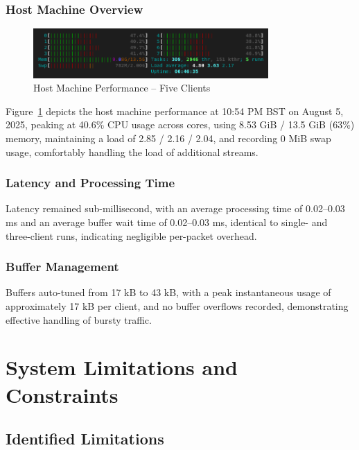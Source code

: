 \subsubsection{Host Machine Overview}

\begin{figure}[H]
\centering
\includegraphics[width=0.8\textwidth]{Evaluation/five-clients-machine-stats.png}
\caption{Host Machine Performance – Five Clients}
\label{fig:host-machine-five-clients}
\end{figure}

Figure~\ref{fig:host-machine-five-clients} depicts the host machine performance at 10:54 PM BST on August 5, 2025, peaking at 40.6\% CPU usage across cores, using 8.53 GiB / 13.5 GiB (63\%) memory, maintaining a load of 2.85 / 2.16 / 2.04, and recording 0 MiB swap usage, comfortably handling the load of additional streams.

\subsubsection{Latency and Processing Time}
Latency remained sub-millisecond, with an average processing time of 0.02–0.03 ms and an average buffer wait time of 0.02–0.03 ms, identical to single- and three-client runs, indicating negligible per-packet overhead.

\subsubsection{Buffer Management}
Buffers auto-tuned from 17 kB to 43 kB, with a peak instantaneous usage of approximately 17 kB per client, and no buffer overflows recorded, demonstrating effective handling of bursty traffic.


\section{System Limitations and Constraints}

\subsection{Identified Limitations}

